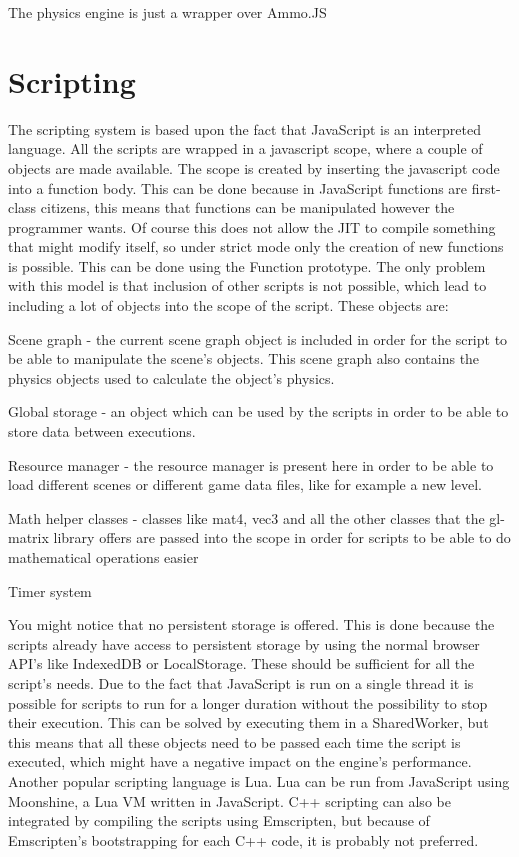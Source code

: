 The physics engine is just a wrapper over Ammo.JS

\section{Scripting}

The scripting system is based upon the fact that JavaScript is an interpreted language. All the scripts are wrapped in a javascript scope, where a couple of objects are made available. The scope is created by inserting the javascript code into a function body. This can be done because in JavaScript functions are first-class citizens, this means that functions can be manipulated however the programmer wants. Of course this does not allow the JIT to compile something that might modify itself, so under strict mode only the creation of new functions is possible. This can be done using the Function prototype.
The only problem with this model is that inclusion of other scripts is not possible, which lead to including a lot of objects into the scope of the script.
These objects are:

\textbullet Scene graph - the current scene graph object is included in order for the script to be able to manipulate the scene’s objects. This scene graph also contains the physics objects used to calculate the object’s physics.

\textbullet Global storage - an object which can be used by the scripts in order to be able to store data between executions.

\textbullet Resource manager - the resource manager is present here in order to be able to load different scenes or different game data files, like for example a new level.

\textbullet Math helper classes - classes like mat4, vec3 and all the other classes that the gl-matrix library offers are passed into the scope in order for scripts to be able to do mathematical operations easier

\textbullet Timer system

You might notice that no persistent storage is offered. This is done because the scripts already have access to persistent storage by using the normal browser API’s like IndexedDB or LocalStorage. These should be sufficient for all the script’s needs.
Due to the fact that JavaScript is run on a single thread it is possible for scripts to run for a longer duration without the possibility to stop their execution. This can be solved by executing them in a SharedWorker, but this means that all these objects need to be passed each time the script is executed, which might have a negative impact on the engine’s performance.
Another popular scripting language is Lua. Lua can be run from JavaScript using Moonshine, a Lua VM written in JavaScript. 
C++ scripting can also be integrated by compiling the scripts using Emscripten, but because of Emscripten’s bootstrapping for each C++ code, it is probably not preferred.


